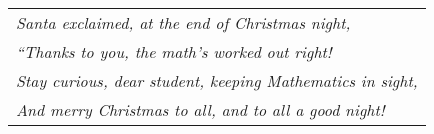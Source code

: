 \documentclass[12pt,letterpaper]{exam}
\begin{document}
\newpage

\phantom{.} \vfill
	\begin{table}[h]
	\centering
	\begin{tabular}{l}
	{\itshape Santa exclaimed, at the end of Christmas night,} \\
	{\itshape ``Thanks to you, the math's worked out right!} \\
	{\itshape Stay curious, dear student, keeping Mathematics in sight,} \\
	{\itshape And merry Christmas to all, and to all a good night!}
	\end{tabular}
	\end{table}
\phantom{.} \vfill
\end{document}
